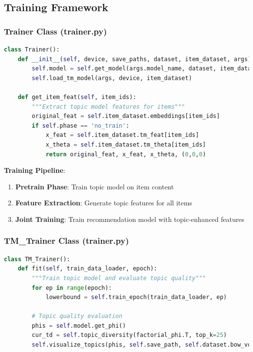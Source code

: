 \subsection{Training Framework}

\subsubsection{Trainer Class (trainer.py)}

\begin{lstlisting}[language=Python, caption=Main Trainer Implementation]
class Trainer():
    def __init__(self, device, save_paths, dataset, item_dataset, args):
        self.model = self.get_model(args.model_name, dataset, item_dataset, args)
        self.load_tm_model(args, device, item_dataset)
        
    def get_item_feat(self, item_ids):
        """Extract topic model features for items"""
        original_feat = self.item_dataset.embeddings[item_ids]
        if self.phase == 'no_train':
            x_feat = self.item_dataset.tm_feat[item_ids]
            x_theta = self.item_dataset.tm_theta[item_ids]
            return original_feat, x_feat, x_theta, (0,0,0)
\end{lstlisting}

\textbf{Training Pipeline}:
\begin{enumerate}
    \item \textbf{Pretrain Phase}: Train topic model on item content
    \item \textbf{Feature Extraction}: Generate topic features for all items
    \item \textbf{Joint Training}: Train recommendation model with topic-enhanced features
\end{enumerate}

\subsubsection{TM\_Trainer Class (trainer.py)}

\begin{lstlisting}[language=Python, caption=Topic Model Trainer]
class TM_Trainer():
    def fit(self, train_data_loader, epoch):
        """Train topic model and evaluate topic quality"""
        for ep in range(epoch):
            lowerbound = self.train_epoch(train_data_loader, ep)
            
        # Topic quality evaluation
        phis = self.model.get_phi()
        cur_td = self.topic_diversity(factorial_phi.T, top_k=25)
        self.visualize_topics(phis, self.save_path, self.dataset.bow_vocab)
\end{lstlisting}

